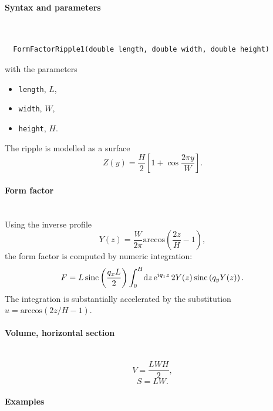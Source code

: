 \paragraph{Syntax and parameters}\strut\\[-2ex plus .2ex minus .2ex]
\begin{lstlisting}
  FormFactorRipple1(double length, double width, double height)
\end{lstlisting}
with the parameters
\begin{itemize}
\item \texttt{length}, $L$,
\item \texttt{width}, $W$,
\item \texttt{height}, $H$.
\end{itemize}

The ripple is modelled as a surface
\begin{equation*}
  Z(y) = \frac{H}{2}\left[ 1 + \cos\frac{2\pi y}{W} \right].
\end{equation*}

\paragraph{Form factor}\strut\\
Using the inverse profile
\begin{equation*}
  Y(z) = \frac{W}{2\pi}\text{arccos}\left( \frac{2z}{H}-1 \right),
\end{equation*}
the form factor is computed by numeric integration:
\begin{equation*}
F = L \operatorname{sinc}\left(\frac{q_xL}{2}\right)
   \int_0^H\!\mathrm d z\,\mathrm e^{iq_zz}\, 2Y(z)\operatorname{sinc}\left(q_y Y(z)\right).
\end{equation*}
The integration is substantially accelerated by the substitution
$u=\text{arccos}( 2z/H-1)$.

\paragraph{Volume, horizontal section}\strut\\
\begin{equation*}
  V = \dfrac{L W H}{2},
\end{equation*}
\begin{equation*}
  S = L W.
\end{equation*}

\paragraph{Examples}\strut

